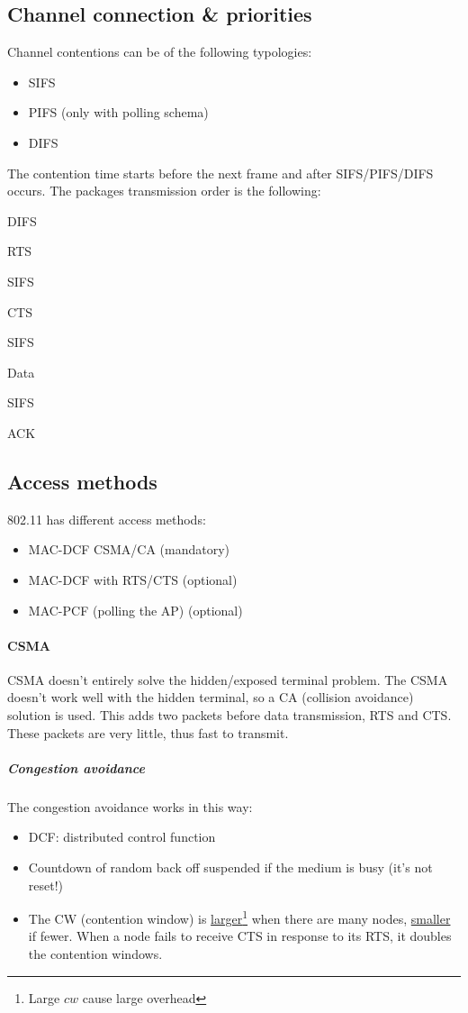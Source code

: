 \subsection{Channel connection \& priorities}
Channel contentions can be of the following typologies:
\begin{itemize}
\item SIFS
\item PIFS (only with polling schema)
\item DIFS
\end{itemize}

The contention time starts before the next frame and after SIFS/PIFS/DIFS
occurs.
The packages transmission order is the following:
\begin{AutoMultiColEnumerate}
\item DIFS
\item RTS
\item SIFS
\item CTS
\item SIFS
\item Data
\item SIFS
\item ACK
\end{AutoMultiColEnumerate}

\subsection{Access methods}
802.11 has different access methods:
\begin{itemize}
\item MAC-DCF CSMA/CA (mandatory)
\item MAC-DCF with RTS/CTS (optional)
\item MAC-PCF (polling the AP) (optional)
\end{itemize}

\paragraph*{CSMA} CSMA doesn't entirely solve the hidden/exposed terminal
problem. The CSMA doesn't work well with the hidden terminal, so a CA
(collision avoidance) solution is used. This adds two packets before data
transmission, RTS and CTS. These packets are very little, thus fast to transmit.

\subparagraph*{Congestion avoidance} The congestion avoidance works in this way:
\begin{itemize}
\item DCF: distributed control function
\item Countdown of random back off suspended if the medium is busy (it's not
  reset!)
\item The CW (contention window) is \underline{larger}\footnote{Large $cw$ cause
  large overhead} when there are many nodes, \underline{smaller} if fewer. When
  a node fails to receive CTS in response to its RTS, it doubles the
  contention windows.
\end{itemize}

